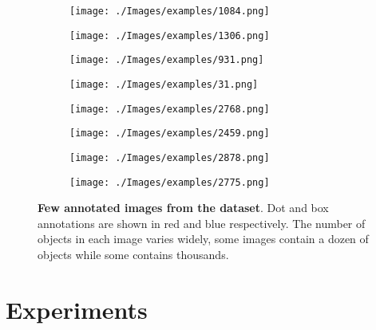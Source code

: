 \begin{figure*}[!th]

  \begin{subfigure}[b]{0.23\textwidth}    \texttt{[image: ./Images/examples/1084.png]}
  \end{subfigure}
  \hfill
  \begin{subfigure}[b]{0.23\textwidth}    \texttt{[image: ./Images/examples/1306.png]}
  \end{subfigure}
  \hfill
    \begin{subfigure}[b]{0.23\textwidth}    \texttt{[image: ./Images/examples/931.png]}%
  \end{subfigure}
  \hfill
      \begin{subfigure}[b]{0.23\textwidth}    \texttt{[image: ./Images/examples/31.png]}
  \end{subfigure}
  \vspace{3pt}

  \begin{subfigure}[b]{0.23\textwidth}    \texttt{[image: ./Images/examples/2768.png]}
  \end{subfigure}
  \hfill
  \begin{subfigure}[b]{0.23\textwidth}    \texttt{[image: ./Images/examples/2459.png]}
  \end{subfigure}
  \hfill
    \begin{subfigure}[b]{0.23\textwidth}    \texttt{[image: ./Images/examples/2878.png]}
  \end{subfigure}
  \hfill
      \begin{subfigure}[b]{0.23\textwidth}    \texttt{[image: ./Images/examples/2775.png]}%
  \end{subfigure}
\vskip -0.05in
  \caption{{\bf Few annotated images from the dataset}. Dot and box annotations are shown in red and blue respectively. The number of objects in each image varies widely, some images contain a dozen of objects while some contains thousands.  \label{fig:annotation_examples} }

\end{figure*}
\section{Experiments}


